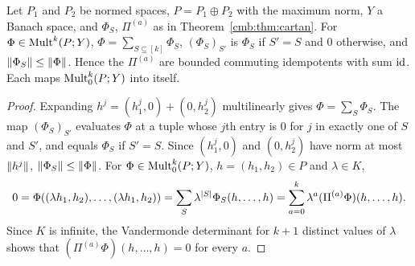 \begin{lemma}\label{ocl:lem:idempotents}
Let $P_1$ and $P_2$ be normed spaces, $P=P_1\oplus P_2$ with the maximum norm, $Y$ a Banach space, and $\Phi_S$,
$\Pi^{(a)}$ as in Theorem~\ref{cmb:thm:cartan}. For $\Phi\in\operatorname{Mult}^k(P;Y)$, $\Phi=\sum_{S\subseteq[k]}\Phi_S$,
$(\Phi_S)_{S'}$ is $\Phi_S$ if $S'=S$ and $0$ otherwise, and $\lVert \Phi_S\rVert\le\lVert \Phi\rVert$. Hence the $\Pi^{(a)}$ are
bounded commuting idempotents with sum $\mathrm{id}$. Each maps $\operatorname{Mult}^k_0(P;Y)$ into itself.
\end{lemma}

\begin{proof}
Expanding $h^j=(h^j_1,0)+(0,h^j_2)$ multilinearly gives $\Phi=\sum_S\Phi_S$. The map $(\Phi_S)_{S'}$ evaluates $\Phi$ at
a tuple whose $j$th entry is $0$ for $j$ in exactly one of $S$ and $S'$, and equals $\Phi_S$ if $S'=S$. Since
$(h^j_1,0)$ and $(0,h^j_2)$ have norm at most $\lVert h^j\rVert$, $\lVert \Phi_S\rVert\le\lVert \Phi\rVert$. For $\Phi\in\operatorname{Mult}^k_0(P;Y)$,
$h=(h_1,h_2)\in P$ and $\lambda\in K$,
\[
 0=\Phi((\lambda h_1,h_2),\dots,(\lambda h_1,h_2))=\sum_S\lambda^{\lvert S\rvert}\Phi_S(h,\dots,h)
 =\sum_{a=0}^k\lambda^a(\Pi^{(a)}\Phi)(h,\dots,h).
\]
Since $K$ is infinite, the Vandermonde determinant for $k+1$ distinct values of $\lambda$ shows that
$(\Pi^{(a)}\Phi)(h,\dots,h)=0$ for every $a$.
\end{proof}

